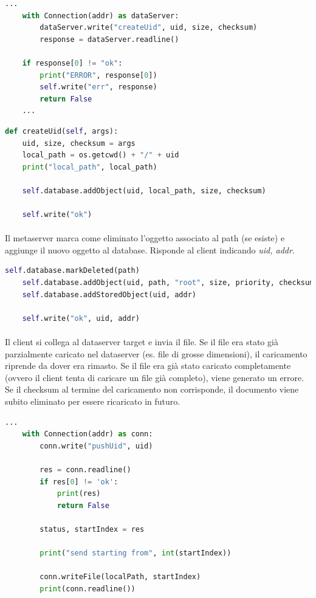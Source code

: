 \documentclass{article}
\begin{document}
\begin{lstlisting}[language=Python, title=Metaserver]
    ...
    with Connection(addr) as dataServer:
        dataServer.write("createUid", uid, size, checksum)
        response = dataServer.readline()

    if response[0] != "ok":
        print("ERROR", response[0])
        self.write("err", response)
        return False
    ...
\end{lstlisting}

\begin{lstlisting}[language=Python, title=Dataserver]
def createUid(self, args):
    uid, size, checksum = args
    local_path = os.getcwd() + "/" + uid
    print("local_path", local_path)

    self.database.addObject(uid, local_path, size, checksum)

    self.write("ok")
\end{lstlisting}

\paragraph{} Il metaserver marca come eliminato l'oggetto associato al path (se esiste) e aggiunge il nuovo oggetto al database. Risponde al client indicando \emph{uid, addr}. 

\begin{lstlisting}[language=Python, title=Metaserver]
    self.database.markDeleted(path)
    self.database.addObject(uid, path, "root", size, priority, checksum)
    self.database.addStoredObject(uid, addr)

    self.write("ok", uid, addr)
\end{lstlisting}

\paragraph{} Il client si collega al dataserver target e invia il file. Se il file era stato già parzialmente caricato nel dataserver (es. file di grosse dimensioni), il caricamento riprende da dover era rimasto. Se il file era già stato caricato completamente (ovvero il client tenta di caricare un file già completo), viene generato un errore. Se il checksum al termine del caricamento non corrisponde, il documento viene subito eliminato per essere ricaricato in futuro. 

\begin{lstlisting}[language=Python, title=Client]
    ...
    with Connection(addr) as conn:
        conn.write("pushUid", uid)

        res = conn.readline()
        if res[0] != 'ok':
            print(res)
            return False

        status, startIndex = res

        print("send starting from", int(startIndex))

        conn.writeFile(localPath, startIndex)
        print(conn.readline())
\end{lstlisting}
\end{document}
